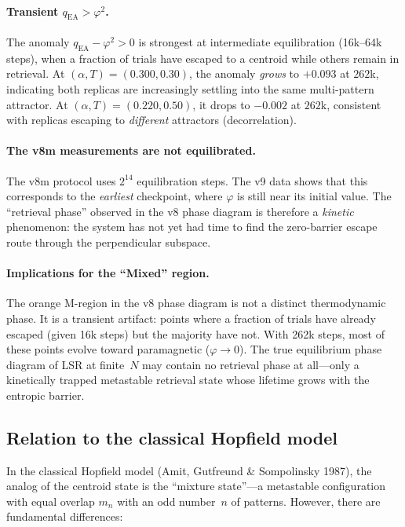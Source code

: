 \documentclass[11pt]{article}
\begin{document}
\paragraph{Transient $q_{\mathrm{EA}} > \varphi^2$.}  The anomaly $q_{\mathrm{EA}} - \varphi^2 > 0$ is strongest at intermediate equilibration (16k--64k steps), when a fraction of trials have escaped to a centroid while others remain in retrieval.  At $(\alpha, T) = (0.300, 0.30)$, the anomaly \emph{grows} to $+0.093$ at $262$k, indicating both replicas are increasingly settling into the same multi-pattern attractor.  At $(\alpha, T) = (0.220, 0.50)$, it drops to $-0.002$ at $262$k, consistent with replicas escaping to \emph{different} attractors (decorrelation).

\paragraph{The v8m measurements are not equilibrated.}  The v8m protocol uses $2^{14}$ equilibration steps.  The v9 data shows that this corresponds to the \emph{earliest} checkpoint, where $\varphi$ is still near its initial value.  The ``retrieval phase'' observed in the v8 phase diagram is therefore a \emph{kinetic} phenomenon: the system has not yet had time to find the zero-barrier escape route through the perpendicular subspace.

\paragraph{Implications for the ``Mixed'' region.}  The orange M-region in the v8 phase diagram is not a distinct thermodynamic phase.  It is a transient artifact: points where a fraction of trials have already escaped (given 16k steps) but the majority have not.  With 262k steps, most of these points evolve toward paramagnetic ($\varphi \to 0$).  The true equilibrium phase diagram of LSR at finite~$N$ may contain no retrieval phase at all---only a kinetically trapped metastable retrieval state whose lifetime grows with the entropic barrier.

\subsection{Relation to the classical Hopfield model}

In the classical Hopfield model (Amit, Gutfreund \& Sompolinsky 1987), the analog of the centroid state is the ``mixture state''---a metastable configuration with equal overlap $m_n$ with an odd number~$n$ of patterns.  However, there are fundamental differences:
\end{document}
